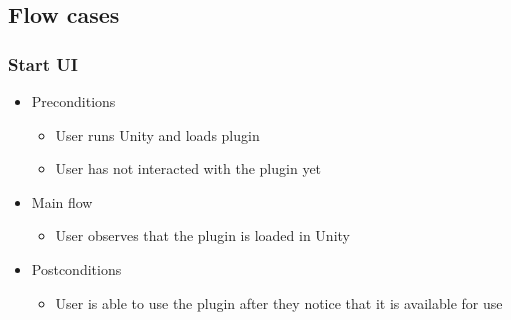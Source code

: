 \subsection{Flow cases}
\subsubsection{Start UI}
    \begin{itemize}
    \item Preconditions
        \begin{itemize}
            \item User runs Unity and loads plugin
            \item User has not interacted with the plugin yet
        \end{itemize}
    \end{itemize}
    \begin{itemize}
        \item Main flow
        \begin{itemize}
            \item User observes that the plugin is loaded in Unity
        \end{itemize}
    \end{itemize}
    \begin{itemize}
        \item Postconditions
        \begin{itemize}
            \item User is able to use the plugin after they notice that it is available for use
        \end{itemize}
    \end{itemize}

